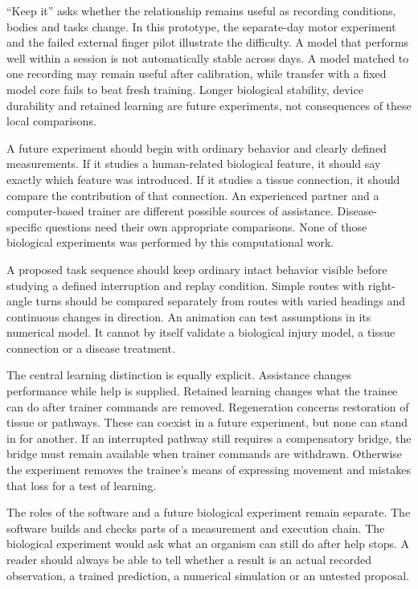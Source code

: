 ``Keep it'' asks whether the relationship remains useful as recording conditions, bodies and tasks change. In this prototype, the separate-day motor experiment and the failed external finger pilot illustrate the difficulty. A model that performs well within a session is not automatically stable across days. A model matched to one recording may remain useful after calibration, while transfer with a fixed model core fails to beat fresh training. Longer biological stability, device durability and retained learning are future experiments, not consequences of these local comparisons.

A future experiment should begin with ordinary behavior and clearly defined measurements. If it studies a human-related biological feature, it should say exactly which feature was introduced. If it studies a tissue connection, it should compare the contribution of that connection. An experienced partner and a computer-based trainer are different possible sources of assistance. Disease-specific questions need their own appropriate comparisons. None of those biological experiments was performed by this computational work.

A proposed task sequence should keep ordinary intact behavior visible before studying a defined interruption and replay condition. Simple routes with right-angle turns should be compared separately from routes with varied headings and continuous changes in direction. An animation can test assumptions in its numerical model. It cannot by itself validate a biological injury model, a tissue connection or a disease treatment.

The central learning distinction is equally explicit. Assistance changes performance while help is supplied. Retained learning changes what the trainee can do after trainer commands are removed. Regeneration concerns restoration of tissue or pathways. These can coexist in a future experiment, but none can stand in for another. If an interrupted pathway still requires a compensatory bridge, the bridge must remain available when trainer commands are withdrawn. Otherwise the experiment removes the trainee's means of expressing movement and mistakes that loss for a test of learning.

The roles of the software and a future biological experiment remain separate. The software builds and checks parts of a measurement and execution chain. The biological experiment would ask what an organism can still do after help stops. A reader should always be able to tell whether a result is an actual recorded observation, a trained prediction, a numerical simulation or an untested proposal.

